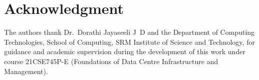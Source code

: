 \documentclass[conference,10pt]{IEEEtran}
\begin{document}
\section*{Acknowledgment}
The authors thank Dr.~Dorathi Jayaseeli J~D and the Department of Computing Technologies, School of Computing, SRM Institute of Science and Technology, for guidance and academic supervision during the development of this work under course 21CSE745P-E (Foundations of Data Centre Infrastructure and Management).

\balance


\end{document}
